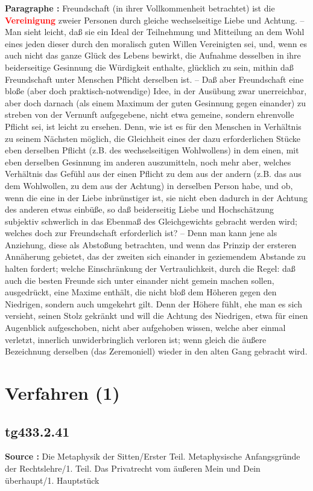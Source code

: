 \documentclass[a4paper,12pt,twoside]{book}
\newcommand{\match}[1]{\textcolor{red}{\textbf{#1}}}
\newcommand{\unnumberedsection}[1]{
	\section*{#1}
	\addcontentsline{toc}{section}{#1}
	\markright{#1}
}
\begin{document}
	\textbf{Paragraphe : }
	Freundschaft (in ihrer Vollkommenheit betrachtet) ist die \match{Vereinigung} zweier Personen durch gleiche wechselseitige Liebe und Achtung. – Man sieht leicht, daß sie ein Ideal der Teilnehmung und Mitteilung an dem Wohl eines jeden dieser durch den moralisch guten Willen Vereinigten sei, und, wenn es auch nicht das ganze Glück des Lebens bewirkt, die Aufnahme desselben in ihre beiderseitige Gesinnung die Würdigkeit enthalte, glücklich zu sein, mithin daß Freundschaft unter Menschen Pflicht derselben ist. – Daß aber Freundschaft eine bloße (aber doch praktisch-notwendige) Idee, in der Ausübung zwar unerreichbar, aber doch darnach (als einem Maximum der guten Gesinnung  gegen einander) zu streben von der Vernunft aufgegebene, nicht etwa gemeine, sondern ehrenvolle Pflicht sei, ist leicht zu ersehen. Denn, wie ist es für den Menschen in Verhältnis zu seinem Nächsten möglich, die Gleichheit eines der dazu erforderlichen Stücke eben derselben Pflicht (z.B. des wechselseitigen Wohlwollens) in dem einen, mit eben derselben Gesinnung im anderen auszumitteln, noch mehr aber, welches Verhältnis das Gefühl aus der einen Pflicht zu dem aus der andern (z.B. das aus dem Wohlwollen, zu dem aus der Achtung) in derselben Person habe, und ob, wenn die eine in der Liebe inbrünstiger ist, sie nicht eben dadurch in der Achtung des anderen etwas einbüße, so daß beiderseitig Liebe und Hochschätzung subjektiv schwerlich in das Ebenmaß des Gleichgewichts gebracht werden wird; welches doch zur Freundschaft erforderlich ist? – Denn man kann jene als Anziehung, diese als Abstoßung betrachten, und wenn das Prinzip der ersteren Annäherung gebietet, das der zweiten sich einander in geziemendem Abstande zu halten fordert; welche Einschränkung der Vertraulichkeit, durch die Regel: daß auch die besten Freunde sich unter einander nicht gemein machen sollen, ausgedrückt, eine Maxime enthält, die nicht bloß dem Höheren gegen den Niedrigen, sondern auch umgekehrt gilt. Denn der Höhere fühlt, ehe man es sich versieht, seinen Stolz gekränkt und will die Achtung des Niedrigen, etwa für einen Augenblick aufgeschoben, nicht aber aufgehoben wissen, welche aber einmal verletzt, innerlich unwiderbringlich verloren ist; wenn gleich die äußere Bezeichnung derselben (das Zeremoniell) wieder in den alten Gang gebracht wird. 
	
	\unnumberedsection{Verfahren (1)} 
	\subsection*{tg433.2.41} 
	\textbf{Source : }Die Metaphysik der Sitten/Erster Teil. Metaphysische Anfangsgründe der Rechtslehre/1. Teil. Das Privatrecht vom äußeren Mein und Dein überhaupt/1. Hauptstück\\  
	
\end{document}
